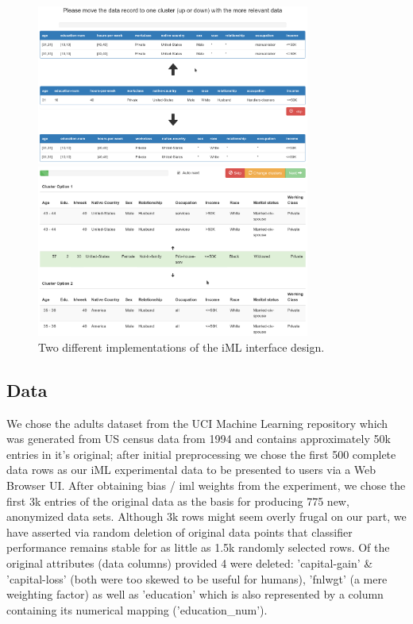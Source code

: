 \documentclass{llncs}
\begin{document}
\begin{figure}[!h]
	\begin{center}
		\vspace{-1.0cm}
		\hspace*{-0.8cm}
		\includegraphics[width=0.8\textwidth]{figures/iml_anon_screen1}
		
		\vspace{1.0cm}
		\hspace*{-0.8cm}
		\includegraphics[width=0.8\textwidth]{figures/iml_anon_screen2}
		\caption{Two different implementations of the iML interface design.}
		\label{fig:iml_UI}
	\end{center}
\end{figure}


\subsection{Data} 
\label{ssect:data}

We chose the adults dataset from the UCI Machine Learning repository which was generated from US census data from 1994 and contains approximately 50k entries in it's original; after initial preprocessing we chose the first 500 complete data rows as our iML experimental data to be presented to users via a Web Browser UI. After obtaining bias / iml weights from the experiment, we chose the first 3k entries of the original data as the basis for producing 775 new, anonymized data sets. Although 3k rows might seem overly frugal on our part, we have asserted via random deletion of original data points that classifier performance remains stable for as little as 1.5k randomly selected rows. Of the original attributes (data columns) provided 4 were deleted: 'capital-gain' \& 'capital-loss' (both were too skewed to be useful for humans), 'fnlwgt' (a mere weighting factor) as well as 'education' which is also represented by a column containing its numerical mapping ('education\_num').
\end{document}
